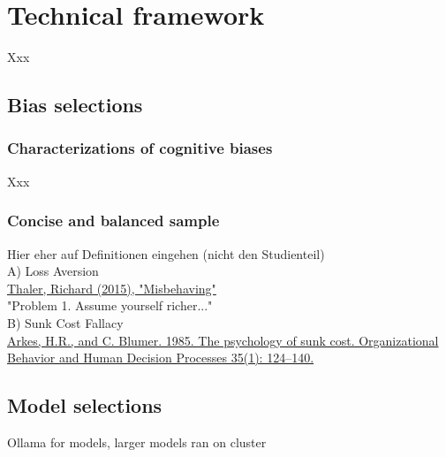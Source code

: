 \section{Technical framework}
Xxx

\subsection{Bias selections}
\subsubsection{Characterizations of cognitive biases}
Xxx

\subsubsection{Concise and balanced sample}
Hier eher auf Definitionen eingehen (nicht den Studienteil) \\

A) Loss Aversion \\
\href{https://books.google.de/books?hl=de&lr=&id=xQedBAAAQBAJ&oi=fnd&pg=PT6&dq=Thaler,+Richard+(2015),+%22Misbehaving%22&ots=c9BiRQvsL-&sig=CCx_VuJCTBOxqXeC0bQkaEzU2ho#v=onepage&q=Thaler%2C%20Richard%20(2015)%2C%20%22Misbehaving%22&f=false}{Thaler, Richard (2015), "Misbehaving"} \\
"Problem 1. Assume yourself richer..." \\

B) Sunk Cost Fallacy \\
\href{http://www.communicationcache.com/uploads/1/0/8/8/10887248/the_psychology_of_sunk_cost.pdf}{Arkes, H.R., and C. Blumer. 1985. The psychology of sunk cost. Organizational Behavior and Human Decision Processes 35(1): 124–140.} \\


\subsection{Model selections}
Ollama for models, larger models ran on cluster